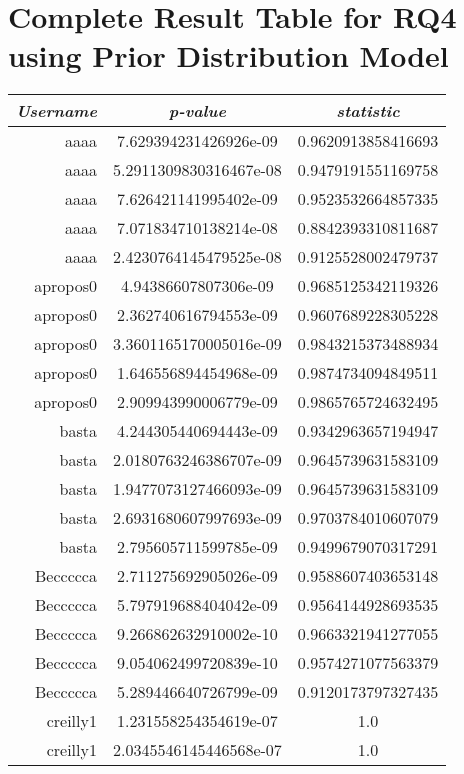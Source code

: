 \chapter{Complete Result Table for RQ4 using Prior Distribution Model}
\label{appendix_rq4_complete_prior_distribution_results_table}

\begin{tabular}{r c c}
    \emph{Username} & \emph{p-value} & \emph{\tau{} statistic} \\\hline\hline
    aaaa & 7.629394231426926e-09 & 0.9620913858416693 \\
    aaaa & 5.2911309830316467e-08 & 0.9479191551169758 \\
    aaaa & 7.626421141995402e-09 & 0.9523532664857335 \\
    aaaa & 7.071834710138214e-08 & 0.8842393310811687 \\
    aaaa & 2.4230764145479525e-08 & 0.9125528002479737 \\
    apropos0 & 4.94386607807306e-09 & 0.9685125342119326 \\
    apropos0 & 2.362740616794553e-09 & 0.9607689228305228 \\
    apropos0 & 3.3601165170005016e-09 & 0.9843215373488934 \\
    apropos0 & 1.646556894454968e-09 & 0.9874734094849511 \\
    apropos0 & 2.909943990006779e-09 & 0.9865765724632495 \\
    basta & 4.244305440694443e-09 & 0.9342963657194947 \\
    basta & 2.0180763246386707e-09 & 0.9645739631583109 \\
    basta & 1.9477073127466093e-09 & 0.9645739631583109 \\
    basta & 2.6931680607997693e-09 & 0.9703784010607079 \\
    basta & 2.795605711599785e-09 & 0.9499679070317291 \\
    Beccccca & 2.711275692905026e-09 & 0.9588607403653148 \\
    Beccccca & 5.797919688404042e-09 & 0.9564144928693535 \\
    Beccccca & 9.266862632910002e-10 & 0.9663321941277055 \\
    Beccccca & 9.054062499720839e-10 & 0.9574271077563379 \\
    Beccccca & 5.289446640726799e-09 & 0.9120173797327435 \\
    creilly1 & 1.231558254354619e-07 & 1.0 \\
    creilly1 & 2.0345546145446568e-07 & 1.0 \\

\end{tabular}
